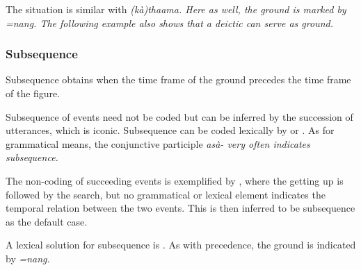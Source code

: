 The situation is similar with \em (kà)thaama\em. Here as well, the ground is marked by \em =nang. \em The following example also shows that  a deictic can serve as ground.




\subsubsection{Subsequence}\label{sec:func:Subsequence}
Subsequence obtains when the time frame of the ground precedes the time frame of the figure.


\z

Subsequence of events need not be coded but can be inferred by the succession of utterances, which is iconic.
Subsequence can be coded lexically by   or  . As for grammatical means, the conjunctive participle \em asà- \em {} very often indicates subsequence.


The non-coding of succeeding events is exemplified by , where the getting up is followed by the search, but no grammatical or lexical element indicates the temporal relation between the two events. This is then inferred to be subsequence as the default case.


A lexical solution for subsequence is . As with precedence, the ground is indicated by \em =nang\em.



